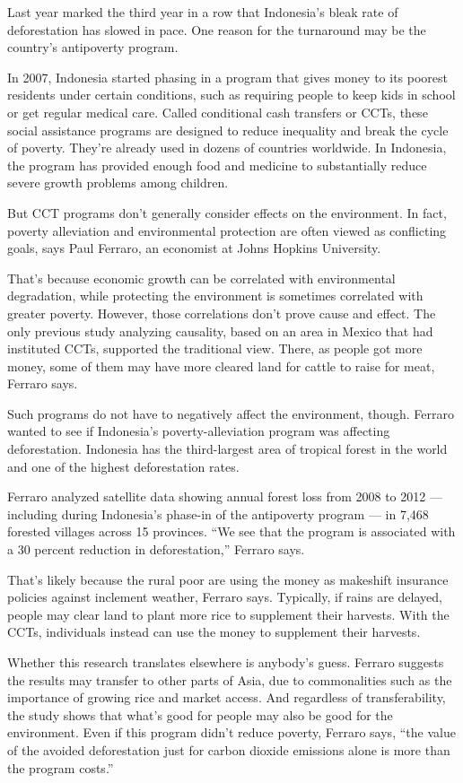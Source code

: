 \documentclass[UTF8,11pt]{ctexart}
\begin{document}
Last year marked the third year in a row that Indonesia’s bleak rate of deforestation has slowed in pace. One reason for the turnaround may be the country’s antipoverty program.


In 2007, Indonesia started phasing in a program that gives money to its poorest residents under certain conditions, such as requiring people to keep kids in school or get regular medical care. Called conditional cash transfers or CCTs, these social assistance programs are designed to reduce inequality and break the cycle of poverty. They’re already used in dozens of countries worldwide. In Indonesia, the program has provided enough food and medicine to substantially reduce severe growth problems among children.


But CCT programs don’t generally consider effects on the environment. In fact, poverty alleviation and environmental protection are often viewed as conflicting goals, says Paul Ferraro, an economist at Johns Hopkins University.


That’s because economic growth can be correlated with environmental degradation, while protecting the environment is sometimes correlated with greater poverty. However, those correlations don’t prove cause and effect. The only previous study analyzing causality, based on an area in Mexico that had instituted CCTs, supported the traditional view. There, as people got more money, some of them may have more cleared land for cattle to raise for meat, Ferraro says.


Such programs do not have to negatively affect the environment, though. Ferraro wanted to see if Indonesia’s poverty-alleviation program was affecting deforestation. Indonesia has the third-largest area of tropical forest in the world and one of the highest deforestation rates.


Ferraro analyzed satellite data showing annual forest loss from 2008 to 2012 — including during Indonesia’s phase-in of the antipoverty program — in 7,468 forested villages across 15 provinces. “We see that the program is associated with a 30 percent reduction in deforestation,” Ferraro says.


That’s likely because the rural poor are using the money as makeshift insurance policies against inclement weather, Ferraro says. Typically, if rains are delayed, people may clear land to plant more rice to supplement their harvests. With the CCTs, individuals instead can use the money to supplement their harvests.


Whether this research translates elsewhere is anybody’s guess. Ferraro suggests the results may transfer to other parts of Asia, due to commonalities such as the importance of growing rice and market access. And regardless of transferability, the study shows that what’s good for people may also be good for the environment. Even if this program didn’t reduce poverty, Ferraro says, “the value of the avoided deforestation just for carbon dioxide emissions alone is more than the program costs.”
\end{document}

